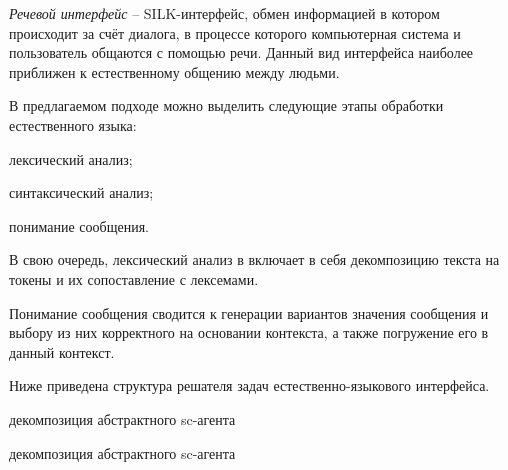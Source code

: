 \begin{SCn}


\end{SCn}

\textit{Речевой интерфейс} -- SILK-интерфейс, обмен информацией в котором происходит за счёт диалога, в процессе которого компьютерная система и пользователь общаются с помощью речи. Данный вид интерфейса наиболее приближен к естественному общению между людьми.

В предлагаемом подходе можно выделить следующие этапы обработки естественного языка:
\begin{textitemize}
    \item лексический анализ;
    \item синтаксический анализ;
    \item понимание сообщения.
\end{textitemize}

В свою очередь, лексический анализ в включает в себя декомпозицию текста на токены и их сопоставление с лексемами.

Понимание сообщения сводится к генерации вариантов значения сообщения и выбору из них корректного на основании контекста, а также погружение его в данный контекст.

Ниже приведена структура решателя задач естественно-языкового интерфейса.

\begin{SCn}

    \begin{scnrelfromset}{декомпозиция абстрактного sc-агента}
        \begin{scnindent}
            \begin{scnrelfromset}{декомпозиция абстрактного sc-агента}
            \end{scnrelfromset}
        \end{scnindent}
    \end{scnrelfromset}

\end{SCn}

